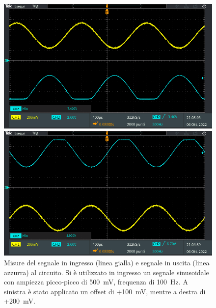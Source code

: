 \begin{figure}[h!]
	\centering	
	\begin{minipage}{.45\textwidth}
		\includegraphics[width=\linewidth]{./ImageFiles/Laboratorio 1/TEK00019}
	\end{minipage}
	\qquad\qquad
	\begin{minipage}{.45\textwidth}
		\includegraphics[width=\linewidth]{./ImageFiles/Laboratorio 1/TEK00021}
	\end{minipage}
	
	\caption{Misure del segnale in ingresso (linea gialla) e segnale in uscita (linea azzurra) al circuito. Si è utilizzato in ingresso un segnale sinusoidale con ampiezza picco-picco di \SI{500}{\milli\volt}, frequenza di \SI{100}{\hertz}.  A sinistra è stato applicato un offset di +\SI{100}{\milli\volt}, mentre a destra di +\SI{200}{\milli\volt}.}
	\label{fig:misure_oscilloscopio_offset_sat}
\end{figure} 
